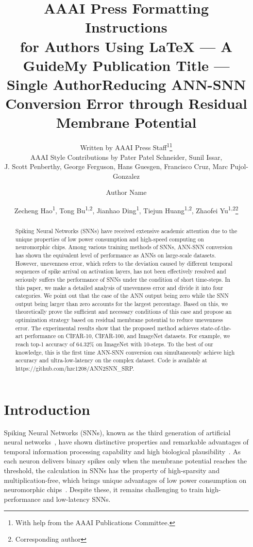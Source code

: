 \documentclass[letterpaper]{article} %
\title{AAAI Press Formatting Instructions \\for Authors Using \LaTeX{} --- A Guide}
\author{
    Written by AAAI Press Staff\textsuperscript{\rm 1}\thanks{With help from the AAAI Publications Committee.}\\
    AAAI Style Contributions by Pater Patel Schneider,
    Sunil Issar,\\
    J. Scott Penberthy,
    George Ferguson,
    Hans Guesgen,
    Francisco Cruz\equalcontrib,
    Marc Pujol-Gonzalez\equalcontrib
}
\title{My Publication Title --- Single Author}
\author {
    Author Name
}
\title{Reducing ANN-SNN Conversion Error through Residual Membrane Potential}
\author {
    Zecheng Hao\textsuperscript{\rm 1},
    Tong Bu\textsuperscript{\rm 1,\rm 2},
    Jianhao Ding\textsuperscript{\rm 1},
    Tiejun Huang\textsuperscript{\rm 1,\rm 2},
    Zhaofei Yu\textsuperscript{\rm 1,\rm 2}\thanks{Corresponding author}
}
\begin{document}
\maketitle


\begin{abstract}
Spiking Neural Networks (SNNs) have received extensive academic attention due to the unique properties of low power consumption and high-speed computing on neuromorphic chips. Among various training methods of SNNs, ANN-SNN conversion has shown the equivalent level of performance as ANNs on large-scale datasets. However, unevenness error, which refers to the deviation caused by different temporal sequences of spike arrival on activation layers, has not been effectively resolved and seriously suffers the performance of SNNs under the condition of short time-steps. In this paper, we make a detailed analysis of unevenness error and divide it into four categories. We point out that the case of the ANN output being zero while the SNN output being larger than zero accounts for the largest percentage. Based on this, we theoretically prove the sufficient and necessary conditions of this case and propose an optimization strategy based on residual membrane potential to reduce unevenness error. The experimental results show that the proposed method achieves state-of-the-art performance on CIFAR-10, CIFAR-100, and ImageNet datasets. For example, we reach top-1 accuracy of 64.32\% on ImageNet with 10-steps. To the best of our knowledge, this is the first time ANN-SNN conversion can simultaneously achieve high accuracy and ultra-low-latency on the complex dataset. Code is available at https://github.com/hzc1208/ANN2SNN\_SRP.


\end{abstract}

\section{Introduction}
Spiking Neural Networks (SNNs), known as the third generation of artificial neural networks~\cite{Wolfgang1997}, have shown distinctive properties and remarkable advantages of temporal information processing capability and high biological plausibility~\cite{roy2019towards}. As each neuron delivers binary spikes only when the membrane potential reaches the threshold, the calculation in SNNs has the property of high-sparsity and multiplication-free, which brings unique advantages of low power consumption on neuromorphic chips~\cite{schemmel2010wafer,furber2012overview,merolla2014million,davies2018loihi,pei2019towards,debole2019truenorth}. 
Despite these, it remains challenging to train high-performance and low-latency SNNs.
\end{document}
